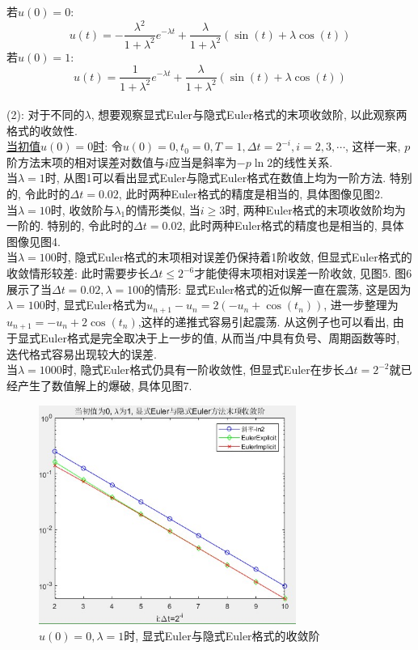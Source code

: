 \documentclass[12pt]{article}
\begin{document}
若$u(0)=0$:\quad$$u(t)=-\frac{\lambda^2}{1+\lambda^2}e^{-\lambda t}+\frac{\lambda}{1+\lambda^2}(\sin (t)+\lambda \cos (t))$$
\noindent 若$u(0)=1$:\quad$$u(t)=\frac{1}{1+\lambda^2}e^{-\lambda t}+\frac{\lambda}{1+\lambda^2}(\sin (t)+\lambda \cos (t))$$\\
(2): 对于不同的$\lambda$, 想要观察显式Euler与隐式Euler格式的末项收敛阶, 以此观察两格式的收敛性. \\
\underline{当初值$u(0)=0$时}: 令$u(0)=0, t_0=0, T=1, \Delta{t}=2^{-i}, i=2,3,\cdots$, 这样一来, $p$阶方法末项的相对误差对数值与$i$应当是斜率为$-p\ln2$的线性关系.\\
当$\lambda=1$时, 从图1可以看出显式Euler与隐式Euler格式在数值上均为一阶方法. 特别的, 令此时的$\Delta{t}=0.02$, 此时两种Euler格式的精度是相当的, 具体图像见图2.\\
当$\lambda=10$时, 收敛阶与$\lambda_1$的情形类似, 当$i\ge3$时, 两种Euler格式的末项收敛阶均为一阶的. 特别的, 令此时的$\Delta{t}=0.02$, 此时两种Euler格式的精度也是相当的, 具体图像见图4.\\
当$\lambda=100$时, 隐式Euler格式的末项相对误差仍保持着1阶收敛, 但显式Euler格式的收敛情形较差: 此时需要步长$\Delta{t}\le2^{-6}$才能使得末项相对误差一阶收敛, 见图5. 图6展示了当$\Delta{t}=0.02, \lambda=100$的情形: 显式Euler格式的近似解一直在震荡, 这是因为$\lambda=100$时, 显式Euler格式为$u_{n+1}-u_n=2(-u_n+\cos(t_n))$, 进一步整理为$u_{n+1}=-u_n+2\cos(t_n)$,这样的递推式容易引起震荡. 从这例子也可以看出, 由于显式Euler格式是完全取决于上一步的值, 从而当$f$中具有负号、周期函数等时, 迭代格式容易出现较大的误差.\\
当$\lambda=1000$时, 隐式Euler格式仍具有一阶收敛性, 但显式Euler在步长$\Delta{t}=2^{-2}$就已经产生了数值解上的爆破, 具体见图7.
\begin{figure}[H]
	\centering
	\includegraphics[width=0.75\textwidth]{1}
	\caption{$u(0)=0, \lambda=1$时, 显式Euler与隐式Euler格式的收敛阶}
\end{figure}
\end{document}
